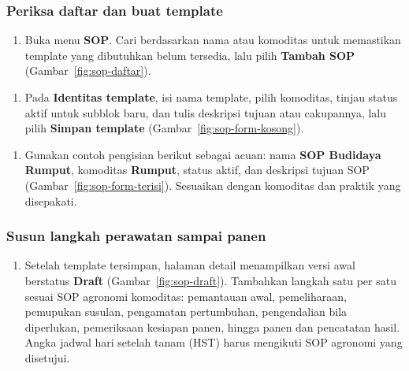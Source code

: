 \subsubsection{Periksa daftar dan buat template}

\begin{enumerate}[series=admin-sop]
  \item Buka menu \textbf{SOP}. Cari berdasarkan nama atau komoditas untuk memastikan template yang dibutuhkan belum tersedia, lalu pilih \textbf{Tambah SOP} (Gambar~\ref{fig:sop-daftar}).
\end{enumerate}


\begin{enumerate}[resume=admin-sop]
  \item Pada \textbf{Identitas template}, isi nama template, pilih komoditas, tinjau status aktif untuk subblok baru, dan tulis deskripsi tujuan atau cakupannya, lalu pilih \textbf{Simpan template} (Gambar~\ref{fig:sop-form-kosong}).
\end{enumerate}


\begin{enumerate}[resume=admin-sop]
  \item Gunakan contoh pengisian berikut sebagai acuan: nama \textbf{SOP Budidaya Rumput}, komoditas \textbf{Rumput}, status aktif, dan deskripsi tujuan SOP (Gambar~\ref{fig:sop-form-terisi}). Sesuaikan dengan komoditas dan praktik yang disepakati.
\end{enumerate}


\subsubsection{Susun langkah perawatan sampai panen}

\begin{enumerate}[resume=admin-sop]
  \item Setelah template tersimpan, halaman detail menampilkan versi awal berstatus \textbf{Draft} (Gambar~\ref{fig:sop-draft}). Tambahkan langkah satu per satu sesuai SOP agronomi komoditas: pemantauan awal, pemeliharaan, pemupukan susulan, pengamatan pertumbuhan, pengendalian bila diperlukan, pemeriksaan kesiapan panen, hingga panen dan pencatatan hasil. Angka jadwal hari setelah tanam (HST) harus mengikuti SOP agronomi yang disetujui.
\end{enumerate}

